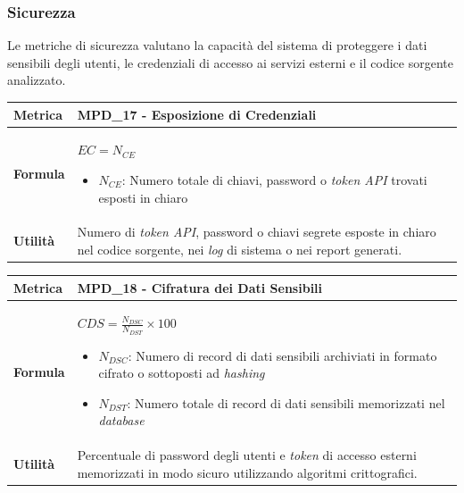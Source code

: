 \documentclass[12pt, a4paper]{article}
\begin{document}
\subsubsection{Sicurezza}
Le metriche di sicurezza valutano la capacità del sistema di proteggere i dati sensibili degli utenti, le credenziali di accesso ai servizi esterni e il codice sorgente analizzato.

\begin{table}[H]
\centering
\renewcommand{\arraystretch}{1.5}
\begin{tabular}{|l|p{12cm}|}
\hline
\textbf{Metrica} & MPD\_17 - Esposizione di Credenziali \\ \hline
\textbf{Formula} & $EC = N_{CE}$
\begin{itemize}
    \item $N_{CE}$: Numero totale di chiavi, password o \textit{token API} trovati esposti in chiaro
\end{itemize} \\ \hline
\textbf{Utilità} & Numero di \textit{token API}, password o chiavi segrete esposte in chiaro nel codice sorgente, nei \textit{log} di sistema o nei report generati. \\ \hline
\end{tabular}
\end{table}

\begin{table}[H]
\centering
\renewcommand{\arraystretch}{1.5}
\begin{tabular}{|l|p{12cm}|}
\hline
\textbf{Metrica} & MPD\_18 - Cifratura dei Dati Sensibili \\ \hline
\textbf{Formula} & $CDS = \frac{N_{DSC}}{N_{DST}} \times 100$
\begin{itemize}
    \item $N_{DSC}$: Numero di record di dati sensibili archiviati in formato cifrato o sottoposti ad \textit{hashing}
    \item $N_{DST}$: Numero totale di record di dati sensibili memorizzati nel \textit{database}
\end{itemize} \\ \hline
\textbf{Utilità} & Percentuale di password degli utenti e \textit{token} di accesso esterni memorizzati in modo sicuro utilizzando algoritmi crittografici. \\ \hline
\end{tabular}
\end{table}
\end{document}
